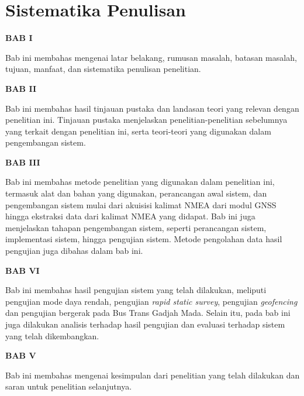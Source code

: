 \section{Sistematika Penulisan}
\textbf{BAB I}

Bab ini membahas mengenai latar belakang, rumusan masalah, batasan masalah, tujuan, manfaat, dan sistematika penulisan penelitian.

\textbf{BAB II}

Bab ini membahas hasil tinjauan pustaka dan landasan teori yang relevan dengan penelitian ini. Tinjauan pustaka menjelaskan penelitian-penelitian sebelumnya yang terkait dengan penelitian ini, serta teori-teori yang digunakan dalam pengembangan sistem.

\textbf{BAB III}

Bab ini membahas metode penelitian yang digunakan dalam penelitian ini, termasuk alat dan bahan yang digunakan, perancangan awal sistem, dan pengembangan sistem mulai dari akuisisi kalimat NMEA dari modul GNSS hingga ekstraksi data dari kalimat NMEA yang didapat. Bab ini juga menjelaskan tahapan pengembangan sistem, seperti perancangan sistem, implementasi sistem, hingga pengujian sistem. Metode pengolahan data hasil pengujian juga dibahas dalam bab ini.  

\textbf{BAB VI}

Bab ini membahas hasil pengujian sistem yang telah dilakukan, meliputi pengujian mode daya rendah, pengujian \textit{rapid static survey}, pengujian \textit{geofencing} dan pengujian bergerak pada Bus Trans Gadjah Mada. Selain itu, pada bab ini juga dilakukan analisis terhadap hasil pengujian dan evaluasi terhadap sistem yang telah dikembangkan.

\textbf{BAB V}

Bab ini membahas mengenai kesimpulan dari penelitian yang telah dilakukan dan saran untuk penelitian selanjutnya.